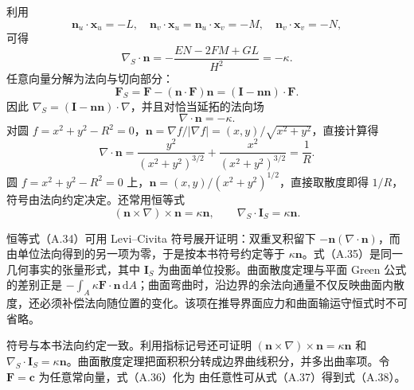 \documentclass[11pt,a4paper,openany,fontset=none]{ctexbook}
\begin{document}
利用
\begin{equation}
 \bm n_u\cdot\bm x_u=-L,\quad
 \bm n_v\cdot\bm x_u=\bm n_u\cdot\bm x_v=-M,\quad
 \bm n_v\cdot\bm x_v=-N, \tag{A.29}
\end{equation}
可得
\begin{equation}
 \nabla_S\cdot\bm n=-\frac{EN-2FM+GL}{H^2}=-\kappa. \tag{A.30}
\end{equation}
任意向量分解为法向与切向部分：
\begin{equation}
 \bm F_S=\bm F-(\bm n\cdot\bm F)\bm n=(\bm I-\bm n\bm n)\cdot\bm F. \tag{A.31}
\end{equation}
因此 $\nabla_S=(\bm I-\bm n\bm n)\cdot\nabla$，并且对恰当延拓的法向场
\begin{equation}
 \nabla\cdot\bm n=-\kappa. \tag{A.32}
\end{equation}
对圆 $f=x^2+y^2-R^2=0$，$\bm n=\nabla f/|\nabla f|=(x,y)/\sqrt{x^2+y^2}$，直接计算得
\begin{equation}
 \nabla\cdot\bm n=\frac{y^2}{(x^2+y^2)^{3/2}}+
 \frac{x^2}{(x^2+y^2)^{3/2}}=\frac1R. \tag{A.33}
\end{equation}
圆 $f=x^2+y^2-R^2=0$ 上，$\bm n=(x,y)/(x^2+y^2)^{1/2}$，直接取散度即得 $1/R$，符号由法向约定决定。还常用恒等式
\begin{equation}
 (\bm n\times\nabla)\times\bm n=\kappa\bm n,
 \qquad \nabla_S\cdot\bm I_S=\kappa\bm n. \tag{A.34--A.35}
\end{equation}

恒等式（A.34）可用 Levi--Civita 符号展开证明：双重叉积留下 $-\bm n(\nabla\cdot\bm n)$，而由单位法向得到的另一项为零，于是按本书符号约定等于 $\kappa\bm n$。式（A.35）是同一几何事实的张量形式，其中 $\bm I_S$ 为曲面单位投影。曲面散度定理与平面 Green 公式的差别正是 $-\int_A\kappa\bm F\cdot\bm n\,\mathrm dA$；曲面弯曲时，沿边界的余法向通量不仅反映曲面内散度，还必须补偿法向随位置的变化。该项在推导界面应力和曲面输运守恒式时不可省略。

符号与本书法向约定一致。利用指标记号还可证明 $(\bm n\times\nabla)\times\bm n=\kappa\bm n$ 和 $\nabla_S\cdot\bm I_S=\kappa\bm n$。曲面散度定理把面积积分转成边界曲线积分，并多出曲率项。令 $\bm F=\bm c$ 为任意常向量，式（A.36）化为
由任意性可从式（A.37）得到式（A.38）。
\end{document}
